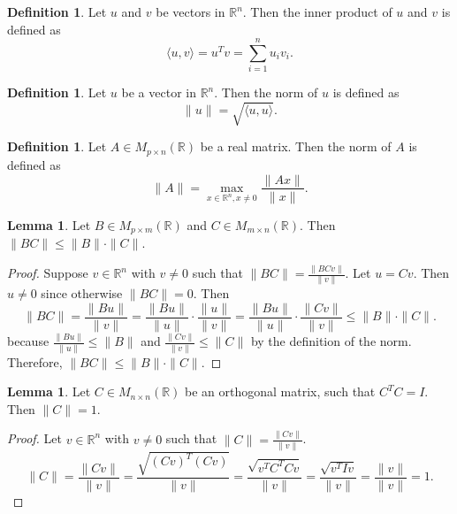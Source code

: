 \documentclass[letterpaper, 11pt]{article}
\newcommand{\R}{\mathbb{R}}   %
\newcommand{\1}{\mathds{1}}		%
\theoremstyle{definition}
\newtheorem{lemma}[theorem]{Lemma}
\newtheorem{definition}[theorem]{Definition}
\begin{document}
\newpage
\begin{definition}
  Let $u$ and $v$ be vectors in $\R^n$. Then the inner product of $u$ and $v$ is defined as
  \[
    \langle u, v \rangle = u^T v = \sum_{i=1}^n u_i v_i.
  \]
\end{definition}
\begin{definition}
  Let $u$ be a vector in $\R^n$. Then the norm of $u$ is defined as
  \[
    \| u \| = \sqrt{\langle u, u \rangle}.
  \]
\end{definition}
\begin{definition}
  Let $A \in M_{p \times n}(\R)$ be a real matrix. Then the norm of $A$ is defined as
  \[
    \| A \| = \max_{x \in \R^n, x \neq 0} \frac{\| Ax \|}{\| x \|}.
  \]
\end{definition}

\begin{lemma}
  Let $B \in M_{p \times m}(\R)$ and $C \in M_{m \times n}(\R)$. Then $\| BC \| \leq \| B \| \cdot \| C \|$.
\end{lemma}
\begin{proof}
  Suppose $v \in \R^n$ with $v \neq 0$ such that $\| BC \| = \frac{\| BCv \|}{\| v \|}$. Let $u = Cv$. Then $u \neq 0$ since otherwise $\| BC \| = 0$. Then
  \[
    \| BC \| = \frac{\| Bu \|}{\| v \|} = \frac{\| Bu \|}{\| u \|} \cdot \frac{\| u \|}{\| v \|} = \frac{\| Bu \|}{\| u \|} \cdot \frac{\| Cv \|}{\| v \|} \leq \| B \| \cdot \| C \|.  
  \]
  because $\frac{\| Bu \|}{\| u \|} \leq \| B \|$ and $\frac{\| Cv \|}{\| v \|} \leq \| C \|$ by the definition of the norm. Therefore, $\| BC \| \leq \| B \| \cdot \| C \|$.
\end{proof}


\begin{lemma}
  Let $C \in M_{n \times n}(\R)$ be an orthogonal matrix, such that $C^T C = I$. Then $\| C \| = 1$.
\end{lemma}
\begin{proof}
  Let $v \in \R^n$ with $v \neq 0$ such that $\| C \| = \frac{\| Cv \|}{\| v \|}$.
  \[
    \| C \| = \frac{\| Cv \|}{\| v \|} = \frac{\sqrt{(Cv)^T (Cv)}}{\| v \|} = \frac{\sqrt{v^T C^T C v}}{\| v \|} = \frac{\sqrt{v^T I v}}{\| v \|} = \frac{\| v \|}{\| v \|} = 1.
  \]
\end{proof}
\end{document}
